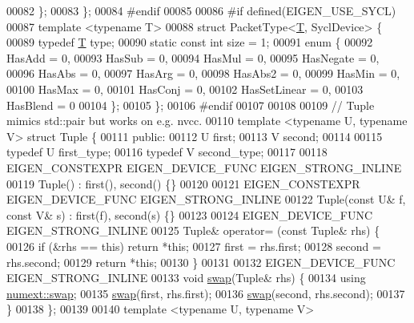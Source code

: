 \begin{DoxyCode}
00082   \};
00083 \};
00084 \textcolor{preprocessor}{#endif}
00085 
00086 \textcolor{preprocessor}{#if defined(EIGEN\_USE\_SYCL)}
00087 \textcolor{keyword}{template} <\textcolor{keyword}{typename} T>
00088   \textcolor{keyword}{struct }PacketType<\hyperlink{group___sparse_core___module_class_eigen_1_1_triplet}{T}, SyclDevice> \{
00089   \textcolor{keyword}{typedef} \hyperlink{group___sparse_core___module_class_eigen_1_1_triplet}{T} type;
00090   \textcolor{keyword}{static} \textcolor{keyword}{const} \textcolor{keywordtype}{int} size = 1;
00091   \textcolor{keyword}{enum} \{
00092     HasAdd    = 0,
00093     HasSub    = 0,
00094     HasMul    = 0,
00095     HasNegate = 0,
00096     HasAbs    = 0,
00097     HasArg    = 0,
00098     HasAbs2   = 0,
00099     HasMin    = 0,
00100     HasMax    = 0,
00101     HasConj   = 0,
00102     HasSetLinear = 0,
00103     HasBlend  = 0
00104   \};
00105 \};
00106 \textcolor{preprocessor}{#endif}
00107 
00108 
00109 \textcolor{comment}{// Tuple mimics std::pair but works on e.g. nvcc.}
00110 \textcolor{keyword}{template} <\textcolor{keyword}{typename} U, \textcolor{keyword}{typename} V> \textcolor{keyword}{struct }Tuple \{
00111  \textcolor{keyword}{public}:
00112   U first;
00113   V second;
00114 
00115   \textcolor{keyword}{typedef} U first\_type;
00116   \textcolor{keyword}{typedef} V second\_type;
00117 
00118   EIGEN\_CONSTEXPR EIGEN\_DEVICE\_FUNC EIGEN\_STRONG\_INLINE
00119   Tuple() : first(), second() \{\}
00120 
00121   EIGEN\_CONSTEXPR EIGEN\_DEVICE\_FUNC EIGEN\_STRONG\_INLINE
00122   Tuple(\textcolor{keyword}{const} U& f, \textcolor{keyword}{const} V& s) : first(f), second(s) \{\}
00123 
00124   EIGEN\_DEVICE\_FUNC EIGEN\_STRONG\_INLINE
00125   Tuple& operator= (\textcolor{keyword}{const} Tuple& rhs) \{
00126     \textcolor{keywordflow}{if} (&rhs == \textcolor{keyword}{this}) \textcolor{keywordflow}{return} *\textcolor{keyword}{this};
00127     first = rhs.first;
00128     second = rhs.second;
00129     \textcolor{keywordflow}{return} *\textcolor{keyword}{this};
00130   \}
00131 
00132   EIGEN\_DEVICE\_FUNC EIGEN\_STRONG\_INLINE
00133   \textcolor{keywordtype}{void} \hyperlink{endian_8c_a3ca5ecd34b04d6a243c054ac3a57f68d}{swap}(Tuple& rhs) \{
00134     \textcolor{keyword}{using} \hyperlink{endian_8c_a3ca5ecd34b04d6a243c054ac3a57f68d}{numext::swap};
00135     \hyperlink{endian_8c_a3ca5ecd34b04d6a243c054ac3a57f68d}{swap}(first, rhs.first);
00136     \hyperlink{endian_8c_a3ca5ecd34b04d6a243c054ac3a57f68d}{swap}(second, rhs.second);
00137   \}
00138 \};
00139 
00140 \textcolor{keyword}{template} <\textcolor{keyword}{typename} U, \textcolor{keyword}{typename} V>

\end{DoxyCode}
